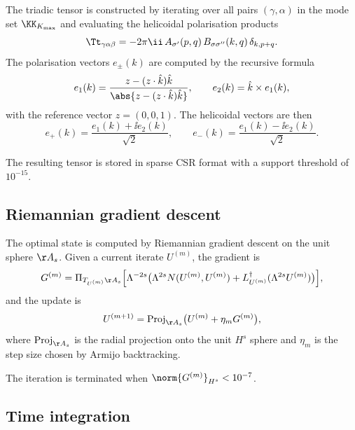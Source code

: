 The triadic tensor is constructed by iterating over all pairs 
$(\gamma,\alpha)$ in the mode set $\KK_{K_{\max}}$ and evaluating 
the helicoidal polarisation products
\begin{equation}\label{eq:tensor-eval}
\Tt_{\gamma\alpha\beta} = -2\pi\ii\,A_{\sigma'}(p,q)\,B_{\sigma\sigma''}(k,q)\,\delta_{k,p+q}.
\end{equation}
The polarisation vectors $e_\pm(k)$ are computed by the recursive 
formula
\begin{equation}\label{eq:polarisation-formula}
e_1(k) = \frac{z - (z\cdot\hat k)\hat k}{\abs{z - (z\cdot\hat k)\hat k}},
\qquad
e_2(k) = \hat k\times e_1(k),
\end{equation}
with the reference vector $z=(0,0,1)$. The helicoidal vectors are 
then
\begin{equation}\label{eq:helicoidal-formula}
e_+(k) = \frac{e_1(k)+\ii e_2(k)}{\sqrt 2},
\qquad
e_-(k) = \frac{e_1(k)-\ii e_2(k)}{\sqrt 2}.
\end{equation}

The resulting tensor is stored in sparse CSR format with a support 
threshold of $10^{-15}$.

\subsection{Riemannian gradient descent}
\label{app:riemannian}

The optimal state is computed by Riemannian gradient descent on the 
unit sphere $\AA_s$. Given a current iterate $U^{(m)}$, the 
gradient is
\begin{equation}\label{eq:grad-formula}
G^{(m)} = \Pi_{T_{U^{(m)}}\AA_s}\Bigl[\Lambda^{-2s}\bigl(\Lambda^{2s}N(U^{(m)},U^{(m)}) + 
L_{U^{(m)}}^\dagger(\Lambda^{2s}U^{(m)})\bigr)\Bigr],
\end{equation}
and the update is
\begin{equation}\label{eq:update-formula}
U^{(m+1)} = \mathrm{Proj}_{\AA_s}\bigl(U^{(m)} + \eta_m G^{(m)}\bigr),
\end{equation}
where $\mathrm{Proj}_{\AA_s}$ is the radial projection onto the unit 
$H^s$ sphere and $\eta_m$ is the step size chosen by Armijo 
backtracking.

The iteration is terminated when $\norm{G^{(m)}}_{H^s}<10^{-7}$.

\subsection{Time integration}
\label{app:time-integration}


